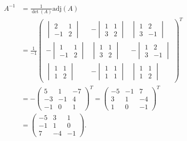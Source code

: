\documentclass[
  12pt,
  oneside]{book}
\theoremstyle{definition}
\theoremstyle{definition}
\theoremstyle{definition}
\theoremstyle{definition}
\theoremstyle{remark}
\begin{document}
\begin{align*}
A^{-1}
&= \frac{1}{\det(A)}\mathrm{adj}(A) \\
&= \frac{1}{-1}
\begin{pmatrix}
\begin{vmatrix}2&1\\-1&2\end{vmatrix}&-\begin{vmatrix}1&1\\3&2\end{vmatrix}&\begin{vmatrix}1&2\\3&-1\end{vmatrix}\\
-\begin{vmatrix}1&1\\-1&2\end{vmatrix}&\begin{vmatrix}1&1\\3&2\end{vmatrix}&-\begin{vmatrix}1&2\\3&-1\end{vmatrix}\\
\begin{vmatrix}1&1\\1&2\end{vmatrix}&-\begin{vmatrix}1&1\\1&1\end{vmatrix}&\begin{vmatrix}1&1\\1&2\end{vmatrix}
\end{pmatrix}^T\\
&=-\begin{pmatrix}
5&1&-7\\-3&-1&4\\-1&0&1
\end{pmatrix}^T =
\begin{pmatrix}
-5&-1&7\\3&1&-4\\1&0&-1
\end{pmatrix}^T \\
&= \begin{pmatrix}
-5&3&1\\-1&1&0\\7&-4&-1
\end{pmatrix}.
\end{align*}
\end{document}
